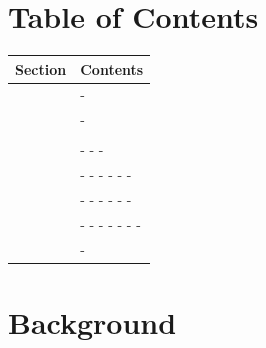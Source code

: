 \documentclass{article}
\author{Sebastian Blair}
\date{\today}
\begin{document}


\section*{Table of Contents}

\begin{table}[H]
    \centering
    \begin{threeparttable}
    \begin{tabular}{p{4.5cm}p{11.6cm}}
      \rowcolor{black!15}
      \textbf{Section} & \textbf{Contents} \\ \hline
      \nameref{sec:back} & \nameref{subsec:which_shell} - \nameref{subsec:when_shell}  \\
      \rowcolor{black!10}
      \nameref{sec:shell_files} & \nameref{subsec:file_ext} - \nameref{subsec:SUID}  \\
      \nameref{sec:env} & \nameref{subsec:STD}\\
      \rowcolor{black!10}
      \nameref{sec:comms} & \nameref{subsec:file_header} - \nameref{subsec:func_comms} - \nameref{subsec:Imp_comms} - \nameref{subsec:todo_comms} \\

      \nameref{sec:Form} & \nameref{subsec:Indent} - \nameref{subsec:Line_Len} - \nameref{subsec:pipelines} - \nameref{subsec:loops} - \nameref{subsec:case_state} - \nameref{subsec:var_exp} - \nameref{subsec:quot} \\
      \rowcolor{black!10}
      \nameref{sec:feat_bugs} & \nameref{subsec:shell_check} - \nameref{subsec:test} - \nameref{subsec:test_str} - \nameref{subsec:wild_file} - \nameref{subsec:eval} - \nameref{subsec:pipes_while} - \nameref{subsec:arth} \\

      \nameref{sec:name_conv} & \nameref{subsec:func_names} - \nameref{subsec:var_names} - \nameref{subsec:con_env_names} - \nameref{subsec:source_fles} - \nameref{subsec:read_var} - \nameref{subsec:loc_vars} - \nameref{subsec:func_loc} - \nameref{subsec:main} \\
      \rowcolor{black!10}
      \nameref{sec:call_cmds} & \nameref{subsec:check_rt_vals} - \nameref{subsec:Built_cmds} \\
    \end{tabular}
    \end{threeparttable}
\end{table}

\section{Background}\label{sec:back}
\end{document}
